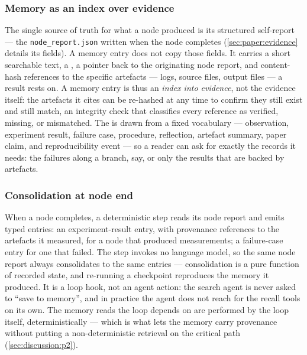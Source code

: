 \subsubsection*{Memory as an index over evidence}

The single source of truth for what a node produced is its structured
self-report --- the \texttt{node\_report.json} written when the node
completes (\cref{sec:paper:evidence} details its fields). A memory entry
does not copy those fields. It carries a short searchable text, a
, a pointer back to the originating node report, and
content-hash references to the specific artefacts --- logs, source files,
output files --- a result rests on. A memory entry is thus an \emph{index
into evidence}, not the evidence itself: the artefacts it cites can be
re-hashed at any time to confirm they still exist and still match, an
integrity check that classifies every reference as verified, missing, or
mismatched. The  is drawn from a fixed vocabulary ---
observation, experiment result, failure case, procedure, reflection,
artefact summary, paper claim, and reproducibility event --- so a reader
can ask for exactly the records it needs: the failures along a branch,
say, or only the results that are backed by artefacts.

\subsubsection*{Consolidation at node end}

When a node completes, a deterministic  step reads
its node report and emits typed entries: an experiment-result entry, with
provenance references to the artefacts it measured, for a node that
produced measurements; a failure-case entry for one that failed. The step
invokes no language model, so the same node report always consolidates to
the same entries --- consolidation is a pure function of recorded state,
and re-running a checkpoint reproduces the memory it produced. It is a
loop hook, not an agent action: the search agent is never asked to ``save
to memory'', and in practice the agent does not reach for the recall
tools on its own. The memory reads the loop depends on are performed by
the loop itself, deterministically --- which is what lets the memory
carry provenance without putting a non-deterministic retrieval on the
critical path (\cref{sec:discussion:p2}).

